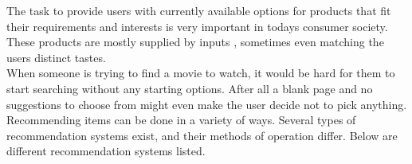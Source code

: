 \documentclass[\myFontSize,a4paper,oneside,hidelinks]{article}
\begin{document}
The task to provide users with currently available options for products that fit their requirements and interests is very important in todays consumer society. These products are mostly supplied by inputs \cite{Philip2014} , sometimes even matching the users distinct tastes.\\
%
When someone is trying to find a movie to watch, it would be hard for them to start searching without any starting options. After all a blank page and no suggestions to choose from might even make the user decide not to pick anything. \\
%
Recommending items can be done in a variety of ways. Several types of recommendation systems exist, and their methods of operation differ. Below are different recommendation systems listed.

%

\end{document}
